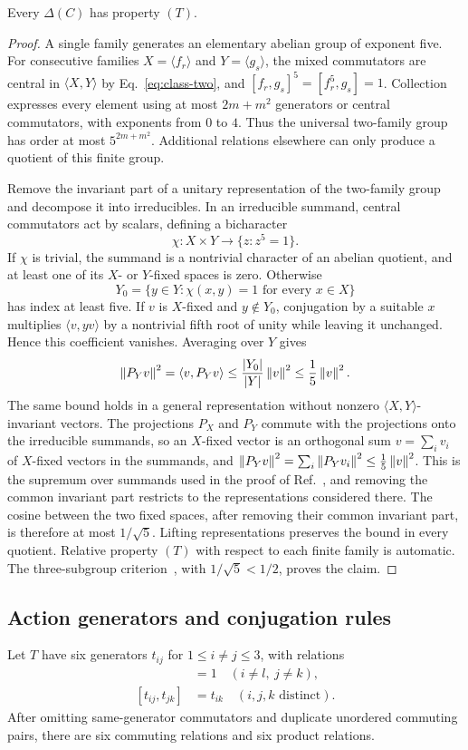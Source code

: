 \begin{lemma}\label{lem:kazhdan-roots}
Every $\Delta(C)$ has property $(T)$.
\end{lemma}
\begin{proof}
A single family generates an elementary abelian group of exponent five. For consecutive
families $X=\langle f_r\rangle$ and $Y=\langle g_s\rangle$, the mixed commutators are
central in $\langle X,Y\rangle$ by Eq.~\eqref{eq:class-two}, and
$[f_r,g_s]^5=[f_r^5,g_s]=1$. Collection expresses every element using at most
$2m+m^2$ generators or central commutators, with exponents from $0$ to $4$. Thus the
universal two-family group has order at most $5^{2m+m^2}$. Additional relations elsewhere
can only produce a quotient of this finite group.

Remove the invariant part of a unitary representation of the two-family group and decompose
it into irreducibles. In an irreducible summand, central commutators act by scalars, defining
a bicharacter
\[
 \chi:X\times Y\longrightarrow\{z:z^5=1\}.
\]
If $\chi$ is trivial, the summand is a nontrivial character of an abelian quotient, and at
least one of its $X$- or $Y$-fixed spaces is zero. Otherwise
\[
 Y_0=\{y\in Y:\chi(x,y)=1\text{ for every }x\in X\}
\]
has index at least five. If $v$ is $X$-fixed and $y\notin Y_0$, conjugation by a suitable
$x$ multiplies $\langle v,yv\rangle$ by a nontrivial fifth root of unity while leaving it
unchanged. Hence this coefficient vanishes. Averaging over $Y$ gives
\[
 \left\lVert P_Yv\right\rVert^2=\langle v,P_Yv\rangle
 \le\frac{|Y_0|}{|Y|}\left\lVert v\right\rVert^2\le\frac15\left\lVert v\right\rVert^2.
\]
The same bound holds in a general representation without nonzero
$\langle X,Y\rangle$-invariant vectors. The projections $P_X$ and $P_Y$ commute with the
projections onto the irreducible summands, so an $X$-fixed vector is an orthogonal sum
$v=\sum_iv_i$ of $X$-fixed vectors in the summands, and
$\left\lVert P_Yv\right\rVert^2=\sum_i\left\lVert P_Yv_i\right\rVert^2\le\frac15\left\lVert v\right\rVert^2$. This is the supremum over
summands used in the proof of Ref.~\cite[Corollary~4.7]{ejz}, and removing the common
invariant part restricts to the representations considered there.
The cosine between the two fixed spaces, after removing their common invariant part, is
therefore at most $1/\sqrt5$. Lifting representations preserves the bound in every
quotient. Relative property $(T)$ with respect to each finite family is automatic. The
three-subgroup criterion~\cite{ejz}, with $1/\sqrt5<1/2$, proves the claim.
\end{proof}

\subsection{Action generators and conjugation rules}
Let $T$ have six generators $t_{ij}$ for $1\le i\ne j\le3$, with relations
\begin{align}
 [t_{ij},t_{kl}]&=1\quad(i\ne l,\ j\ne k),\label{eq:t-comm}\\
 [t_{ij},t_{jk}]&=t_{ik}\quad(i,j,k\text{ distinct}).\label{eq:t-prod}
\end{align}
After omitting same-generator commutators and duplicate unordered commuting pairs, there
are six commuting relations and six product relations.

